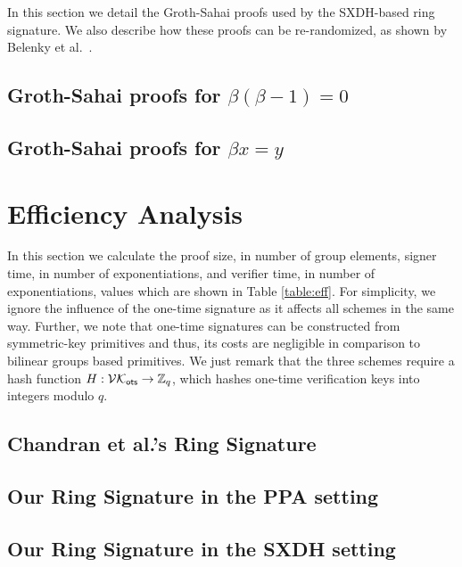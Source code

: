 \documentclass{llncs}
\begin{document}
	In this section we detail the Groth-Sahai proofs used by the SXDH-based ring signature. We also describe how these proofs can be re-randomized, as shown by Belenky et al.~\cite{C:BCCKLS09}.
		\subsection{Groth-Sahai proofs for $\beta(\beta-1)=0$} \label{sec:GSproofs-h}
		
			
			
		\subsection{Groth-Sahai proofs for $\beta x = y$} \label{sec:GSproofs-g}
		
			

%

	\section{Efficiency Analysis} \label{sec:eff-analysis}
		In this section we calculate the proof size, in number of group elements, signer time, in number of exponentiations, and verifier time, in number of exponentiations, values which are shown in Table \ref{table:eff}. For simplicity, we ignore the influence of the one-time signature as it affects all schemes in the same way. Further, we note that one-time signatures can be constructed from symmetric-key primitives and thus, its costs are negligible in comparison to bilinear groups based primitives. We just remark that the three schemes require a hash function $H:\mathcal{VK}_{\mathsf{ots}}\to\mathbb{Z}_q$, which hashes one-time verification keys into integers modulo $q$.
		\subsection{Chandran et al.'s Ring Signature}
			
		\subsection{Our Ring Signature in the PPA setting}
			
		\subsection{Our Ring Signature in the SXDH setting}
			
			
\end{document}
